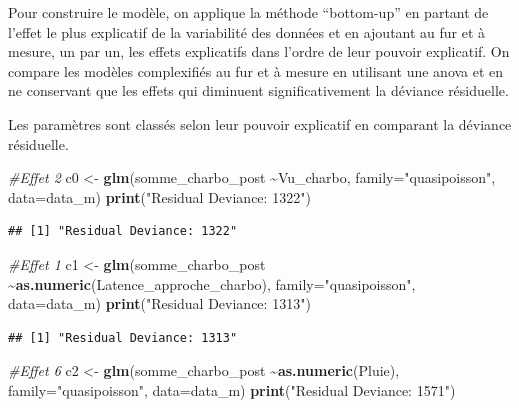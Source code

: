 \documentclass[
  french,
]{article}
\newenvironment{Shaded}{\begin{snugshade}}{\end{snugshade}}
\newcommand{\AttributeTok}[1]{\textcolor[rgb]{0.13,0.29,0.53}{#1}}
\newcommand{\CommentTok}[1]{\textcolor[rgb]{0.56,0.35,0.01}{\textit{#1}}}
\newcommand{\FunctionTok}[1]{\textcolor[rgb]{0.13,0.29,0.53}{\textbf{#1}}}
\newcommand{\NormalTok}[1]{#1}
\newcommand{\OtherTok}[1]{\textcolor[rgb]{0.56,0.35,0.01}{#1}}
\newcommand{\SpecialCharTok}[1]{\textcolor[rgb]{0.81,0.36,0.00}{\textbf{#1}}}
\newcommand{\StringTok}[1]{\textcolor[rgb]{0.31,0.60,0.02}{#1}}
\begin{document}
Pour construire le modèle, on applique la méthode ``bottom-up'' en
partant de l'effet le plus explicatif de la variabilité des données et
en ajoutant au fur et à mesure, un par un, les effets explicatifs dans
l'ordre de leur pouvoir explicatif. On compare les modèles complexifiés
au fur et à mesure en utilisant une anova et en ne conservant que les
effets qui diminuent significativement la déviance résiduelle.

Les paramètres sont classés selon leur pouvoir explicatif en comparant
la déviance résiduelle.

\begin{Shaded}
\begin{Highlighting}[]
\CommentTok{\#Effet 2}
\NormalTok{c0 }\OtherTok{\textless{}{-}} \FunctionTok{glm}\NormalTok{(somme\_charbo\_post }\SpecialCharTok{\textasciitilde{}}\NormalTok{Vu\_charbo, }\AttributeTok{family=}\StringTok{"quasipoisson"}\NormalTok{, }\AttributeTok{data=}\NormalTok{data\_m)}
\FunctionTok{print}\NormalTok{(}\StringTok{"Residual Deviance: 1322"}\NormalTok{)}
\end{Highlighting}
\end{Shaded}

\begin{verbatim}
## [1] "Residual Deviance: 1322"
\end{verbatim}

\begin{Shaded}
\begin{Highlighting}[]
\CommentTok{\#Effet 1}
\NormalTok{c1 }\OtherTok{\textless{}{-}} \FunctionTok{glm}\NormalTok{(somme\_charbo\_post }\SpecialCharTok{\textasciitilde{}}\FunctionTok{as.numeric}\NormalTok{(Latence\_approche\_charbo), }\AttributeTok{family=}\StringTok{"quasipoisson"}\NormalTok{, }\AttributeTok{data=}\NormalTok{data\_m)}
\FunctionTok{print}\NormalTok{(}\StringTok{"Residual Deviance: 1313"}\NormalTok{)}
\end{Highlighting}
\end{Shaded}

\begin{verbatim}
## [1] "Residual Deviance: 1313"
\end{verbatim}

\begin{Shaded}
\begin{Highlighting}[]
\CommentTok{\#Effet 6}
\NormalTok{c2 }\OtherTok{\textless{}{-}} \FunctionTok{glm}\NormalTok{(somme\_charbo\_post }\SpecialCharTok{\textasciitilde{}}\FunctionTok{as.numeric}\NormalTok{(Pluie), }\AttributeTok{family=}\StringTok{"quasipoisson"}\NormalTok{, }\AttributeTok{data=}\NormalTok{data\_m)}
\FunctionTok{print}\NormalTok{(}\StringTok{"Residual Deviance: 1571"}\NormalTok{)}
\end{Highlighting}
\end{Shaded}
\end{document}
